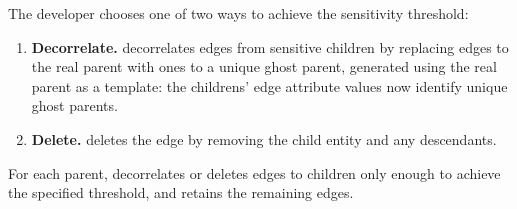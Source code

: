 
The developer chooses one of two ways to achieve the sensitivity threshold: 
\begin{enumerate}
    \item \textbf{Decorrelate.}
    \sys decorrelates edges from sensitive children by replacing edges to the real parent with
        ones to a unique ghost parent, generated using the real parent as a template:
        the childrens' edge attribute values now identify unique ghost parents. 

\item \textbf{Delete.}
    \sys deletes the edge by removing the child entity and any descendants. 
\end{enumerate}

For each parent, \sys decorrelates or deletes edges to children only enough to achieve the specified
threshold, and retains the remaining edges. 


\iffalse
